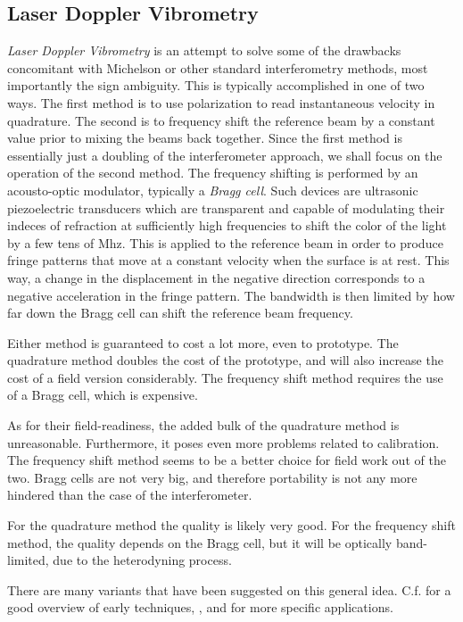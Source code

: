 \documentclass[a4paper,10pt]{report}
\numberwithin{equation}{section}
\begin{document}
 \subsection{Laser Doppler Vibrometry}
 \emph{Laser Doppler Vibrometry} is an attempt to solve some of the drawbacks concomitant with Michelson or other standard interferometry methods, most importantly the sign ambiguity. \cite{Giuliani2003}
 This is typically accomplished in one of two ways. The first method is to use polarization to read instantaneous velocity in quadrature. The second is to frequency shift the reference beam by a constant value prior to mixing the beams back together.\cite{Giuliani2003}
 Since the first method is essentially just a doubling of the interferometer approach, we shall focus on the operation of the second method. The frequency shifting is performed by an acousto-optic modulator, typically a \emph{Bragg cell}. Such devices are ultrasonic piezoelectric transducers which are transparent and capable of modulating their indeces of refraction at sufficiently high frequencies to shift the color of the light by a few tens of Mhz. This is applied to the reference beam in order to produce fringe patterns that move at a constant velocity when the surface is at rest. This way, a change in the displacement in the negative direction corresponds to a negative acceleration in the fringe pattern. The bandwidth is then limited by how far down the Bragg cell can shift the reference beam frequency.\cite[p.~241]{Baker1990}
 
 Either method is guaranteed to cost a lot more, even to prototype. The quadrature method doubles the cost of the prototype, and will also increase the cost of a field version considerably. The frequency shift method requires the use of a Bragg cell, which is expensive.
 
 As for their field-readiness, the added bulk of the quadrature method is unreasonable. Furthermore, it poses even more problems related to calibration. The frequency shift method seems to be a better choice for field work out of the two. Bragg cells are not very big, and therefore portability is not any more hindered than the case of the interferometer.
 
For the quadrature method the quality is likely very good. For the frequency shift method, the quality depends on the Bragg cell, but it will be optically band-limited, due to the heterodyning process.
 
 There are many variants that have been suggested on this general idea. C.f. \cite{Pickering1986} for a good overview of early techniques, \cite{Baker1990}, and \cite{Roos1996} for more specific applications. 
\end{document}

